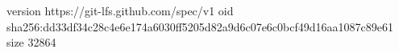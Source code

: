 version https://git-lfs.github.com/spec/v1
oid sha256:dd33df34c28c4e6e174a6030ff5205d82a9d6c07e6c0bcf49d16aa1087c89e61
size 32864
